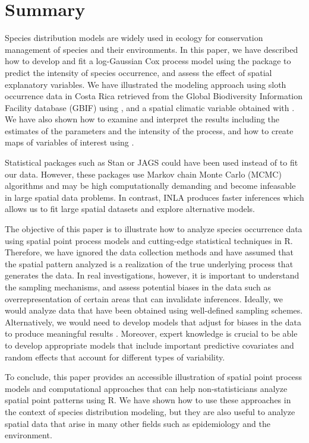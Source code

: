 \section{Summary}

Species distribution models are widely used in ecology for conservation management of species and their environments. In this paper, we have described how to develop and fit a log-Gaussian Cox process model
using the  package
to predict the intensity of species occurrence, and assess the effect of spatial explanatory variables.
We have illustrated the modeling approach using sloth occurrence data in Costa Rica retrieved from the Global Biodiversity Information Facility database (GBIF) using , and a spatial climatic variable obtained with .
We have also shown how to examine and interpret the results
including the estimates of the parameters and the intensity of the process, and how to create maps of variables of interest using .


Statistical packages such as Stan \citep{stan} or JAGS \citep{jags} could have been used instead of  to fit our data.
However, these packages use Markov chain Monte Carlo (MCMC) algorithms and may be high computationally demanding and become infeasable in large spatial data problems. In contrast, INLA produces faster inferences which allows us to fit large spatial datasets and explore alternative models.

The objective of this paper is to illustrate how to analyze species occurrence data using spatial point process models and cutting-edge statistical techniques in R.
Therefore, we have ignored the data collection methods and have assumed that the spatial pattern analyzed is a realization of the true underlying process that generates the data.
In real investigations, however, it is important to understand the sampling mechanisms, and assess potential biases in the data such as overrepresentation of certain areas that can invalidate inferences.
Ideally, we would analyze data that have been obtained using well-defined sampling schemes. Alternatively, we would need to develop models that adjust for biases in the data to produce meaningful results \citep{giraudetal15, dorazio14, fithianetal15}.
Moreover, expert knowledge is crucial to be able to develop appropriate models that include important predictive covariates and random effects that account for different types of variability.

To conclude, this paper provides an accessible illustration of spatial point process models and computational approaches that can help non-statisticians analyze spatial point patterns using R.
We have shown how to use these approaches in the context of species distribution modeling, but they are also useful to analyze spatial data that arise in many other fields such as epidemiology and the environment.


